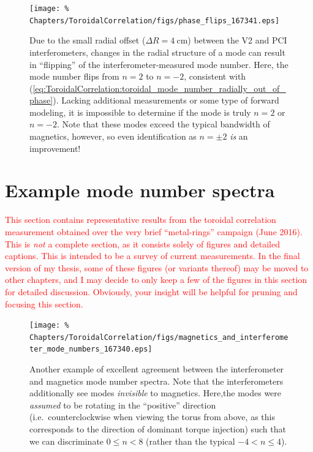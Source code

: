 \begin{figure}
  \centering
  \texttt{[image: \%
    Chapters/ToroidalCorrelation/figs/phase\_flips\_167341.eps]}
  \caption[Mode-number ``flipping'' due to the small radial offset
      between the $V2$ and PCI interferometers]{%
    Due to the small radial offset ($\Delta R = \SI{4}{\centi\meter}$)
    between the V2 and PCI interferometers,
    changes in the radial structure of a mode
    can result in ``flipping'' of the interferometer-measured mode number.
    Here, the mode number flips from $n = 2$ to $n = -2$,
    consistent with
    (\ref{eq:ToroidalCorrelation:toroidal_mode_number_radially_out_of_phase}).
    Lacking additional measurements or some type of forward modeling,
    it is impossible to determine if the mode is truly $n = 2$ or $n = -2$.
    Note that these modes exceed the typical bandwidth of magnetics, however,
    so even identification as $n = \pm 2$ \emph{is} an improvement!}
\label{fig:ToroidalCorrelation:mode_number_flips}
\end{figure}


\section{Example mode number spectra}
\label{sec:ToroidalCorrelation:survey_of_spectra}
\textcolor{red}{%
  This section contains representative results
  from the toroidal correlation measurement
  obtained over the very brief ``metal-rings'' campaign (June 2016).
  This is \emph{not} a complete section,
  as it consists solely of figures and detailed captions.
  This is intended to be a survey of current measurements.
  In the final version of my thesis,
  some of these figures (or variants thereof)
  may be moved to other chapters, and
  I may decide to only keep a few of the figures
  in this section for detailed discussion.
  Obviously, your insight will be helpful
  for pruning and focusing this section.
}

\begin{figure}[h!]
  \centering
  \texttt{[image: \%
    Chapters/ToroidalCorrelation/figs/magnetics\_and\_interferometer\_mode\_numbers\_167340.eps]}
  \caption[Another example of excellent agreement between the
      interferometer and magnetics mode number spectra]{%
    Another example of excellent agreement between the
    interferometer and magnetics mode number spectra. Note that
    the interferometers additionally see modes \emph{invisible} to magnetics.
    Here,the modes were \emph{assumed} to be rotating
    in the ``positive'' direction
    (i.e.\ counterclockwise when viewing the torus from above,
    as this corresponds to the direction of dominant torque injection)
    such that we can discriminate $0 \leq n < 8$
    (rather than the typical $-4 < n \leq 4$).}
\label{fig:ToroidalCorrelation:magnetics_corroboration_2}
\end{figure}

